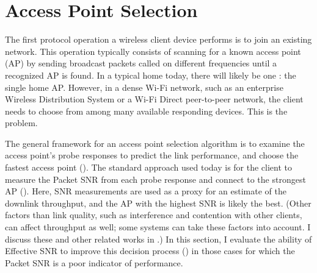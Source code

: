 \section{Access Point Selection}\label{sec:esnr_apsel}
The first protocol operation a wireless client device performs is to join an existing network. This operation typically consists of scanning for a known access point (AP) by sending broadcast packets called  on different frequencies until a recognized AP is found. In a typical home today, there will likely be one : the single home AP. However, in a dense Wi-Fi network, such as an enterprise Wireless Distribution System or a Wi-Fi Direct peer-to-peer network, the client needs to choose from among many available responding devices. This is the  problem.

The general framework for an access point selection algorithm is to examine the access point's probe responses to predict the link performance, and choose the fastest access point (). The standard approach used today is for the client to measure the Packet SNR from each probe response and connect to the strongest AP (). Here, SNR measurements are used as a proxy for an estimate of the downlink throughput, and the AP with the highest SNR is likely the best. (Other factors than link quality, such as interference and contention with other clients, can affect throughput as well; some systems can take these factors into account. I discuss these and other related works in .)
In this section, I evaluate the ability of Effective SNR to improve this decision process () in those cases for which the Packet SNR is a poor indicator of performance.


